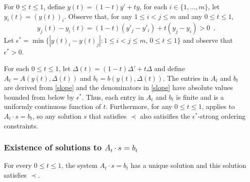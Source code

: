 \documentclass{patmorin}
\begin{document}
   For $0\le t\le 1$, define $y(t) = (1-t)y' + ty$, for each $i\in\{1,\ldots,m\}$, let $y_i(t)=(y(t))_i$.
   Observe that, for any $1\le i< j\le m$ and any $0\le t\le 1$,
   \[
       y_j(t) - y_i(t) = (1-t)(y'_j-y'_i) + t(y_j-y_i) > 0 \enspace .
   \]
   Let $\epsilon^*=\min\{|y(t)_i-y(t)_j| : 1\le i< j\le m,\, 0\le t\le 1\}$
   and observe that $\epsilon^* >0$.

   For each $0\le t\le 1$, let $\Delta(t)=(1-t)\Delta' + t\Delta$ and define
   $A_t=A(y(t),\Delta(t))$ and $b_t=b(y(t),\Delta(t))$.  The entries in
   $A_t$ and $b_t$ are derived from \eqref{slope} and the denominators in
   \eqref{slope} have absolute values bounded from below by $\epsilon^*$.
   Thus, each entry in $A_t$ and $b_t$ is finite and is a uniformly
   continuous function of $t$.  Furthermore, for any $0\le t\le 1$,
    applies to $A_t\cdot s =b_t$, so any solution
   $s$ that satisfies $\prec$ also satisifies the $\epsilon^*$-strong
   ordering constraints.

\subsubsection{Existence of solutions to $A_t\cdot s=b_t$}


\begin{lem}
   For every $0\le t\le 1$, the system $A_t\cdot s=b_t$ has a unique solution
   and this solution satisfies $\prec$.
\end{lem}
\end{document}
